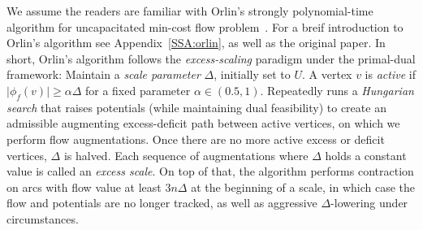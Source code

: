 \documentclass[a4paper,UKenglish]{socg-lipics-v2018}
\def\abs#1{\mathopen| #1 \mathclose|}		%
\def\fsupply{\phi}
\theoremstyle{plain}
\numberwithin{figure}{section}
\def\EMPH#1{\textcolor{BrickRed}{{\emph{#1}}}}
\begin{document}
We assume the readers are familiar with Orlin's strongly polynomial-time algorithm for uncapacitated min-cost flow problem~\cite{O93}.
For a breif introduction to Orlin's algorithm see Appendix~\ref{SSA:orlin},
as well as the original paper.
%
In short, Orlin's algorithm follows the \EMPH{excess-scaling} paradigm under the primal-dual framework:
Maintain a \EMPH{scale parameter} $\Delta$, initially set to $U$.
A vertex $v$ is \EMPH{active} if $\abs{\fsupply_f(v)} \geq \alpha\Delta$ for a fixed parameter $\alpha \in (0.5, 1)$.
Repeatedly runs a \emph{Hungarian search} that raises potentials (while maintaining dual
feasibility) to create an admissible augmenting excess-deficit path between active vertices, on which
we perform flow augmentations.
Once there are no more active excess or deficit vertices, $\Delta$ is halved.
Each sequence of augmentations where $\Delta$ holds a constant value is called
an \EMPH{excess scale}.
On top of that, the algorithm performs contraction on arcs with flow value at least $3n\Delta$ at the beginning of a scale, in which case the flow and potentials are no longer tracked, as well as aggressive $\Delta$-lowering under circumstances.
\end{document}
